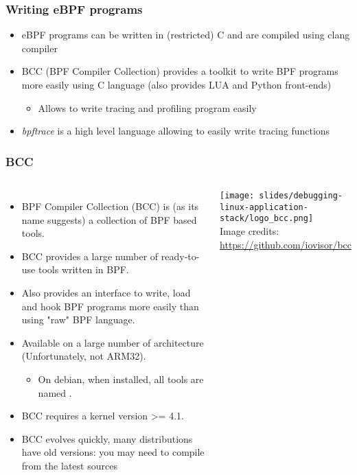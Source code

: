 \begin{frame}[fragile]
  \frametitle{Writing eBPF programs}
  \begin{itemize}
    \item eBPF programs can be written in (restricted) C and are compiled
          using clang compiler
    \item BCC (BPF Compiler Collection) provides a toolkit to write BPF
          programs more easily using C language (also provides LUA and Python
          front-ends)
    \begin{itemize}
      \item Allows to write tracing and profiling program easily
    \end{itemize}
    \item {\em bpftrace} is a high level language allowing to easily write tracing
          functions
  \end{itemize}
\end{frame}

\begin{frame}[fragile]
  \frametitle{BCC}
  \begin{columns}
    \begin{itemize}
      \item BPF Compiler Collection (BCC) is (as its name suggests) a collection
            of BPF based tools.
      \item BCC provides a large number of ready-to-use tools written in BPF.
      \item Also provides an interface to write, load and hook BPF programs more
            easily than using "raw" BPF language.
      \item Available on a large number of architecture (Unfortunately, not ARM32).
      \begin{itemize}
        \item On debian, when installed, all tools are named .
      \end{itemize}
      \item BCC requires a kernel version >= 4.1.
      \item BCC evolves quickly, many distributions have old versions: you
            may need to compile from the latest sources
    \end{itemize}
  \vspace{0.5cm}
  \texttt{[image: slides/debugging-linux-application-stack/logo\_bcc.png]}\\ 
  \tiny Image credits: \url{https://github.com/iovisor/bcc}
  \end{columns}
\end{frame}

